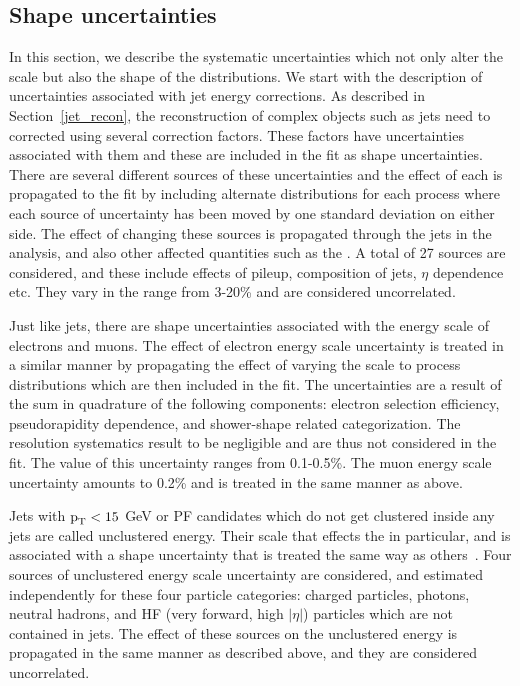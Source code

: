 \subsection{Shape uncertainties}
In this section, we describe the systematic uncertainties which not only alter the scale but also the shape of the distributions. We start with the description of uncertainties associated with jet energy corrections. As described in Section~\ref{jet_recon}, the reconstruction of complex objects such as jets need to corrected using several correction factors. These factors have uncertainties associated with them and these are included in the fit as shape uncertainties. There are several different sources of these uncertainties and the effect of each is propagated to the fit by including alternate distributions for each process where each source of uncertainty has been moved by one standard deviation on either side. The effect of changing these sources is propagated through the jets in the analysis, and also other affected quantities such as the \ptmiss. A total of 27 sources are considered, and these include effects of pileup, composition of jets, $\eta$ dependence etc. They vary in the range from 3-20\% and are considered uncorrelated.

Just like jets, there are shape uncertainties associated with the energy scale of electrons and muons. The effect of electron energy scale uncertainty is treated in a similar manner by propagating the effect of varying the scale to process distributions which are then included in the fit. The uncertainties are a result of the sum in quadrature of the following components: electron selection efficiency, pseudorapidity dependence, and shower-shape related categorization. The resolution systematics result to be negligible and are thus not considered in the fit. The value of this uncertainty ranges from 0.1-0.5\%. The muon energy scale uncertainty amounts to 0.2\% and is treated in the same manner as above.

Jets with $\text{p}_\text{T}<15$ GeV or PF candidates which do not get clustered inside any jets are called unclustered energy. Their scale that effects the \ptmiss in particular, and is associated with a shape uncertainty that is treated the same way as others~\cite{Sirunyan:2019kia}. Four sources of unclustered energy scale uncertainty are considered, and estimated independently for these four particle categories: charged particles, photons, neutral hadrons, and HF (very forward, high $|\eta|$) particles which are not contained in jets. The effect of these sources on the unclustered energy is propagated in the same manner as described above, and they are considered uncorrelated.

